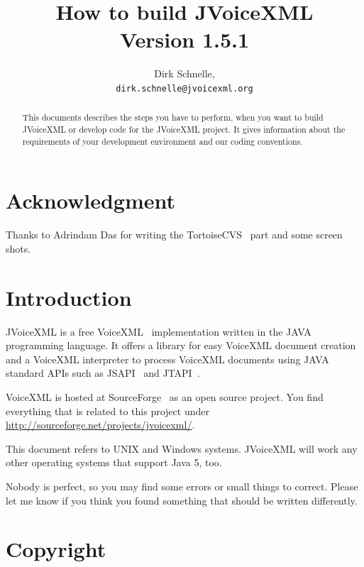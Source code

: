 \documentclass[11pt,a4paper]{article}
\title{How to build JVoiceXML \\
Version 1.5.1}
\author{Dirk Schnelle,  \\
  \texttt{dirk.schnelle@jvoicexml.org} }
\date{}
\begin{document}
\pagestyle{headings}

\maketitle

\begin{abstract}
This documents describes the steps you have to perform, when you want
to build JVoiceXML or develop code for the JVoiceXML project. It gives
information about the requirements of your development environment 
and our coding conventions.
\end{abstract}

\section*{Acknowledgment}

Thanks to Adrindam Das for writing the TortoiseCVS~\cite{tortoisecvs} 
part and some screen shots.

\section{Introduction}
\label{sec:introduction}

JVoiceXML is a free VoiceXML~\cite{w3.org:voicexml} implementation written in 
the JAVA programming language. It offers a library for easy VoiceXML
document creation and a VoiceXML interpreter to process 
VoiceXML documents using JAVA standard APIs such as JSAPI~\cite{sun:jsapi} and
JTAPI~\cite{sun:jsapi}.

VoiceXML is hosted at SourceForge~\cite{sourceforge} as an open source project.
You find everything that is related to this project under
\url{http://sourceforge.net/projects/jvoicexml/}.

This document refers to UNIX and Windows systems. JVoiceXML will work 
any other operating systems that support Java 5, too.

Nobody is perfect, so you may find some errors or small things to correct.
Please let me know if you think you found something that should be written
differently.

\section{Copyright}
\label{sec:copyright}
\end{document}
